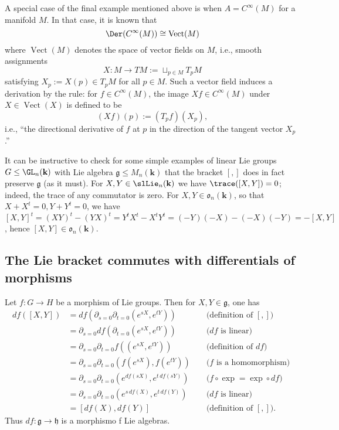 \documentclass[reqno]{amsart} 
\begin{document}
A special case of the final example mentioned above
is when $A = C^\infty(M)$
for a manifold $M$.
In that case,
it is known that
\begin{equation*}
  \Der(C^\infty(M))
  \cong \operatorname{Vect}(M)
\end{equation*}
where $\operatorname{Vect}(M)$ denotes the space of vector fields
on $M$,
i.e.,
smooth assignments
\begin{equation*}
  X : M \rightarrow T M := \sqcup_{p \in M} T_p M
\end{equation*}
satisfying $X_p := X(p) \in T_p M$ for all $p \in M$.
Such a vector field induces a derivation
by the rule: for $f \in C^\infty(M)$,
the image $X f \in C^\infty(M)$ under $X \in \operatorname{Vect}(X)$
is defined to be
\begin{equation*}
  (X f)(p) := (T_p f)(X_p),
\end{equation*}
i.e., ``the directional derivative of $f$ at $p$ in the direction
of the tangent vector $X_p$.''


\begin{remark}
  \label{rmk:}
  It can be instructive to check for some simple examples
  of linear Lie groups $G \leq \GL_n(\mathbf{k})$
  with Lie algebra $\mathfrak{g} \leq M_n(\mathbf{k})$
  that the bracket $[,]$ does in fact preserve $\mathfrak{g}$
  (as it must).
  For $X,Y \in \slLie_n(\mathbf{k})$
  we have $\trace([X,Y]) = 0$; indeed, the trace of any commutator
  is zero.
  For $X,Y \in \mathfrak{o}_n(\mathbf{k})$,
  so that $X + X^t = 0, Y + Y^t = 0$,
  we have $[X,Y]^t = (X Y)^t - (Y X)^t
  = Y^t X^t - X^t Y^t
  = (-Y)(-X) - (-X)(-Y)
  = -[X,Y]$,
  hence $[X,Y] \in \mathfrak{o}_n(\mathbf{k})$.
\end{remark}

\subsection{The Lie bracket commutes with differentials of morphisms\label{sec:diff-morphism-is-morphism}}
\label{sec:org96fd5c4}
Let $f : G \rightarrow H$ be a morphism of Lie groups.
Then for $X, Y \in \mathfrak{g}$,
one has
\begin{align*}
  d f ([X,Y])
  &=
    d f( \partial_{s=0} \partial_{t=0} (e^{s X}, e^{t Y}))
  &&
  \text{ (definition of $[,]$) }
  \\ 
  &=
    \partial_{s=0}  d f( \partial_{t=0} (e^{s X}, e^{t Y}))
    && \text{ ($d f$ is linear) }
    \\
  &=
    \partial_{s=0}  \partial_{t=0}
    f(  (e^{s X}, e^{t Y}))
    && \text{ (definition of $d f$) }
    \\
  &=
    \partial_{s=0}  \partial_{t=0}
    (f(e^{s X}), f(e^{t Y}))
    && \text{ ($f$ is a homomorphism) }
    \\
  &=
    \partial_{s=0}  \partial_{t=0}
    (e^{d f(s X)}, e^{t \, d f(s Y)})
  && \text{ ($f \circ \exp = \exp \circ d f$)}
     \\
  &=
    \partial_{s=0}  \partial_{t=0}
    (e^{s \, d f(X)}, e^{t \, d f(Y)})
  && \text{ ($d f$ is linear)}
     \\
  &=
    [d f(X), d f(Y)]
  && \text{ (definition of $[,]$)}.
\end{align*}
Thus $d f : \mathfrak{g} \rightarrow \mathfrak{h}$ is a morphismo f Lie algebras.
\end{document}
